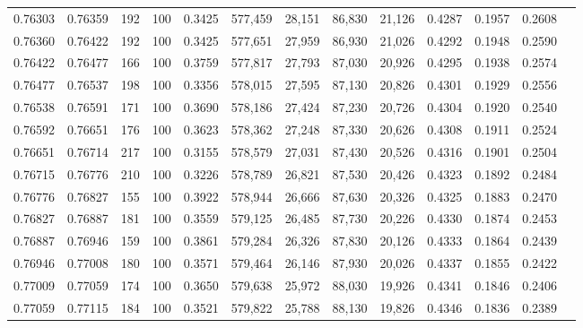 \begin{tabular}{rrrrrrrrrrrrr}
0.76303 & 0.76359 &   192 & 100 &                                     0.3425 & 577,459 &  28,151 &  86,830 &  21,126 & 0.4287 & 0.1957 & 0.2608 \\
0.76360 & 0.76422 &   192 & 100 &                                     0.3425 & 577,651 &  27,959 &  86,930 &  21,026 & 0.4292 & 0.1948 & 0.2590 \\
0.76422 & 0.76477 &   166 & 100 &                                     0.3759 & 577,817 &  27,793 &  87,030 &  20,926 & 0.4295 & 0.1938 & 0.2574 \\
0.76477 & 0.76537 &   198 & 100 &                                     0.3356 & 578,015 &  27,595 &  87,130 &  20,826 & 0.4301 & 0.1929 & 0.2556 \\
0.76538 & 0.76591 &   171 & 100 &                                     0.3690 & 578,186 &  27,424 &  87,230 &  20,726 & 0.4304 & 0.1920 & 0.2540 \\
0.76592 & 0.76651 &   176 & 100 &                                     0.3623 & 578,362 &  27,248 &  87,330 &  20,626 & 0.4308 & 0.1911 & 0.2524 \\
0.76651 & 0.76714 &   217 & 100 &                                     0.3155 & 578,579 &  27,031 &  87,430 &  20,526 & 0.4316 & 0.1901 & 0.2504 \\
0.76715 & 0.76776 &   210 & 100 &                                     0.3226 & 578,789 &  26,821 &  87,530 &  20,426 & 0.4323 & 0.1892 & 0.2484 \\
0.76776 & 0.76827 &   155 & 100 &                                     0.3922 & 578,944 &  26,666 &  87,630 &  20,326 & 0.4325 & 0.1883 & 0.2470 \\
0.76827 & 0.76887 &   181 & 100 &                                     0.3559 & 579,125 &  26,485 &  87,730 &  20,226 & 0.4330 & 0.1874 & 0.2453 \\
0.76887 & 0.76946 &   159 & 100 &                                     0.3861 & 579,284 &  26,326 &  87,830 &  20,126 & 0.4333 & 0.1864 & 0.2439 \\
0.76946 & 0.77008 &   180 & 100 &                                     0.3571 & 579,464 &  26,146 &  87,930 &  20,026 & 0.4337 & 0.1855 & 0.2422 \\
0.77009 & 0.77059 &   174 & 100 &                                     0.3650 & 579,638 &  25,972 &  88,030 &  19,926 & 0.4341 & 0.1846 & 0.2406 \\
0.77059 & 0.77115 &   184 & 100 &                                     0.3521 & 579,822 &  25,788 &  88,130 &  19,826 & 0.4346 & 0.1836 & 0.2389 \\

\end{tabular}
